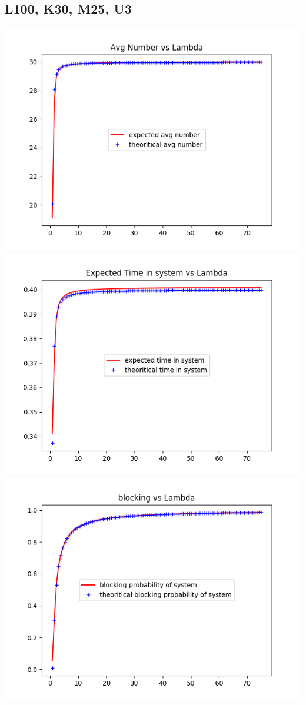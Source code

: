 \documentclass[11pt]{article}
\begin{document}
  \subsection{L100, K30, M25, U3}
 \includegraphics{ExpectedNumber_L100_K30_M25_U3}
  \includegraphics{ExpectedTime_L100_K30_M25_U3}
 \includegraphics{BlockingProbability_L100_K30_M25_U3}
\end{document}
